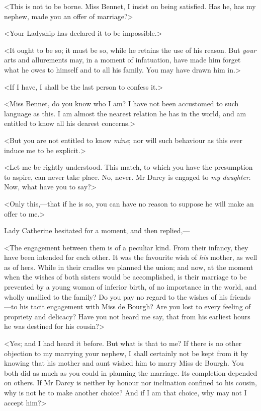 <This is not to be borne. Miss Bennet, I insist on being satisfied. Has he, has my nephew, made you an offer of marriage?>

<Your Ladyship has declared it to be impossible.>

<It ought to be so; it must be so, while he retains the use of his reason. But \textit{your} arts and allurements may, in a moment of infatuation, have made him forget what he owes to himself and to all his family. You may have drawn him in.>

<If I have, I shall be the last person to confess it.>

<Miss Bennet, do you know who I am? I have not been accustomed to such language as this. I am almost the nearest relation he has in the world, and am entitled to know all his dearest concerns.>

<But you are not entitled to know \textit{mine}; nor will such behaviour as this ever induce me to be explicit.>

<Let me be rightly understood. This match, to which you have the presumption to aspire, can never take place. No, never. Mr Darcy is engaged to \textit{my daughter}. Now, what have you to say?>

<Only this,—that if he is so, you can have no reason to suppose he will make an offer to me.>

Lady Catherine hesitated for a moment, and then replied,—

<The engagement between them is of a peculiar kind. From their infancy, they have been intended for each other. It was the favourite wish of \textit{his} mother, as well as of hers. While in their cradles we planned the union; and now, at the moment when the wishes of both sisters would be accomplished, is their marriage to be prevented by a young woman of inferior birth, of no importance in the world, and wholly unallied to the family? Do you pay no regard to the wishes of his friends—to his tacit engagement with Miss de Bourgh? Are you lost to every feeling of propriety and delicacy? Have you not heard me say, that from his earliest hours he was destined for his cousin?>

<Yes; and I had heard it before. But what is that to me? If there is no other objection to my marrying your nephew, I shall certainly not be kept from it by knowing that his mother and aunt wished him to marry Miss de Bourgh. You both did as much as you could in planning the marriage. Its completion depended on others. If Mr Darcy is neither by honour nor inclination confined to his cousin, why is not he to make another choice? And if I am that choice, why may not I accept him?>

